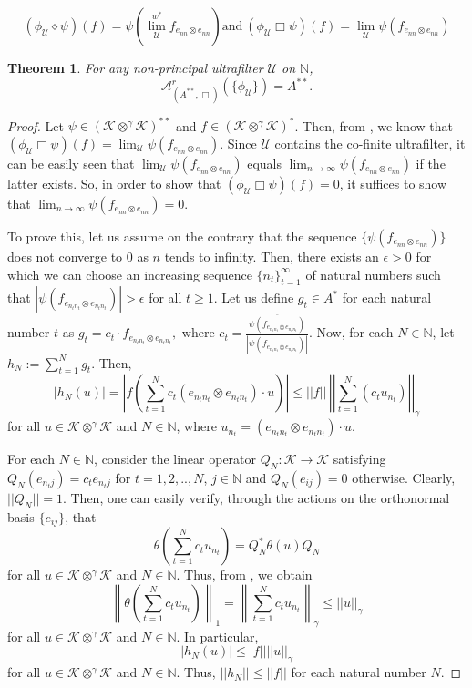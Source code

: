 \documentclass[10pt,a4paper]{amsart}
\newtheorem{thm}{Theorem}
\newcommand{\N}{\mathbb N}
\newcommand{\mK}{\mathcal{K}}
\newcommand{\obp}{\otimes^{\gamma}}
\newcommand{\ot}{\otimes}
\begin{document}
\begin{equation} \label{eqn:3.1}
(\phi_{\mathcal U}\diamond
  \psi)(f)=\psi\left(\overset{w^*}{\lim_{\mathcal U}} f_{ e_{nn}\otimes
    e_{nn}}\right) \mathrm{ and }\ (\phi_{\mathcal U}\Box \psi)(f) =
  \lim_{\mathcal U}\psi(f_{ e_{nn} \otimes e_{nn}})
\end{equation}

\begin{thm}\label{ann-box}
	For any non-principal ultrafilter $\mathcal U$ on $\mathbb
        N$, $$\mathcal{A}^r_{(A^{**},\Box)}\left(\{\phi_{\mathcal
          U}\}\right)=A^{**}.$$
	\end{thm}

\begin{proof}
Let $\psi\in (\mK \obp \mK)^{**}$ and $f\in (\mathcal K\obp\mathcal
K)^{*}$. Then, from , we know that $(\phi_{\mathcal U}
\Box \psi)(f) = \lim_{\mathcal{ U}} \psi(f_{e_{nn} \ot e_{nn}})$.
Since $\mathcal{U}$ contains the co-finite ultrafilter, it can be
easily seen that $\lim_{\mathcal{ U}} \psi(f_{e_{nn} \ot e_{nn}})$ equals
$\lim_{n\to \infty} \psi(f_{e_{nn} \ot e_{nn}})$ if the latter exists. So, in
order to show that $ (\phi_{\mathcal U}\Box \psi)(f)=0 $, it suffices
to show that $\lim_{n\to \infty}\psi(f_{ e_{nn} \otimes e_{nn}}) =0$.

To prove this, let us assume on the contrary that the sequence
$\{\psi(f_{e_{nn} \otimes e_{nn}})\}$ does not converge to $0$ as $n$
tends to infinity. Then, there exists an $\epsilon>0$ for which we can choose an
increasing sequence $\{n_t\}_{t=1}^\infty$ of natural numbers such
that $|\psi(f_{ e_{n_tn_t} \otimes e_{n_tn_t}})|>\epsilon$ for all $t
\geq 1$.  Let us define $g_{t}\in A^*$ for each natural number $t$ as
$g_{t}=c_{t}\cdot f_{ e_{n_tn_t}\otimes e_{n_tn_t}},$ where
$c_t=\frac{\overline{\psi(f_{ e_{n_tn_t} \otimes
      e_{n_tn_t}})}}{\left\vert\psi(f_{e_{n_tn_t} \otimes
    e_{n_tn_t}})\right\vert}$. Now, for each $N \in \N$, let
$h_N:=\sum_{t=1}^Ng_{t}$. Then,
\[
	|h_N(u)| = \left\vert f\left (\sum_{t=1}^N c_t(
        e_{n_tn_t}\otimes e_{n_tn_t})\cdot u\right)\right\vert \leq
        ||f||\,
        \left\vert\left\vert\sum_{t=1}^N(c_tu_{n_t})\right\vert\right\vert_{\gamma}
\]
for all $u \in \mK\obp \mK$ and $N \in \N$, where $u_{n_t}=(e_{n_tn_t}\otimes e_{n_tn_t})\cdot u$.

For each $N \in \N$, consider the linear operator $Q_N:\mathcal K\to
\mathcal K$ satisfying $Q_N(e_{n_tj})=c_t e_{n_tj}$ for $t=1,2,..,N$,
$j\in \mathbb N$ and $Q_N(e_{ij})=0$ otherwise. Clearly,
$||Q_N||=1$. Then, one can easily verify, through the actions on the
orthonormal basis $\{e_{ij}\}$, that
\[
\theta\left(\sum_{t=1}^Nc_tu_{n_t}\right)=Q_N^*\theta(u)Q_N
\]
for all $u \in \mK \obp \mK$ and $N \in \N$. Thus, from ,
we obtain
\[
\left\|\theta\left(\sum_{t=1}^Nc_tu_{n_t}\right)\right\|_1=\left\|\sum_{t=1}^Nc_tu_{n_t}\right\|_\gamma\leq
||u||_\gamma
\]
for all $u \in \mK \obp \mK$ and $N \in \N$. In particular,
\[
  |h_N(u)|\leq |f||||u||_\gamma
  \]
  for all $u \in \mK\obp \mK$ and $N \in \N$.  Thus, $||h_N||\leq
  ||f||$ for each natural number $N$.


\end{proof}
\end{document}

